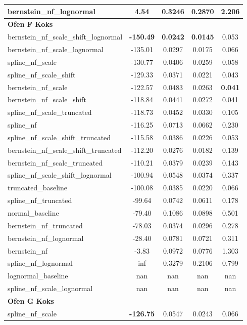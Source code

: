 \begin{table}[t]
\begin{tabular}{lcccc}
  bernstein\_nf\_lognormal & 4.54 & 0.3246 & 0.2870 & 2.206 \\
\midrule
\multicolumn{5}{l}{\textbf{Ofen F Koks}} \\
  bernstein\_nf\_scale\_shift\_lognormal & \textbf{-150.49} & \textbf{0.0242} & \textbf{0.0145} & 0.053 \\
  bernstein\_nf\_scale\_lognormal & -135.01 & 0.0297 & 0.0175 & 0.066 \\
  spline\_nf\_scale & -130.77 & 0.0406 & 0.0259 & 0.058 \\
  spline\_nf\_scale\_shift & -129.33 & 0.0371 & 0.0221 & 0.043 \\
  bernstein\_nf\_scale & -122.57 & 0.0483 & 0.0263 & \textbf{0.041} \\
  bernstein\_nf\_scale\_shift & -118.84 & 0.0441 & 0.0272 & 0.041 \\
  spline\_nf\_scale\_truncated & -118.73 & 0.0452 & 0.0330 & 0.105 \\
  spline\_nf & -116.25 & 0.0713 & 0.0662 & 0.230 \\
  spline\_nf\_scale\_shift\_truncated & -115.58 & 0.0386 & 0.0226 & 0.053 \\
  bernstein\_nf\_scale\_shift\_truncated & -112.20 & 0.0276 & 0.0182 & 0.139 \\
  bernstein\_nf\_scale\_truncated & -110.21 & 0.0379 & 0.0239 & 0.143 \\
  spline\_nf\_scale\_shift\_lognormal & -100.94 & 0.0548 & 0.0374 & 0.337 \\
  truncated\_baseline & -100.08 & 0.0385 & 0.0220 & 0.066 \\
  spline\_nf\_truncated & -99.64 & 0.0742 & 0.0611 & 0.178 \\
  normal\_baseline & -79.40 & 0.1086 & 0.0898 & 0.501 \\
  bernstein\_nf\_truncated & -78.03 & 0.0374 & 0.0296 & 0.278 \\
  bernstein\_nf\_lognormal & -28.40 & 0.0781 & 0.0721 & 0.311 \\
  bernstein\_nf & -3.83 & 0.0972 & 0.0776 & 1.303 \\
  spline\_nf\_lognormal & inf & 0.3279 & 0.2106 & 0.799 \\
  lognormal\_baseline & nan & nan & nan & nan \\
  spline\_nf\_scale\_lognormal & nan & nan & nan & nan \\
\midrule
\multicolumn{5}{l}{\textbf{Ofen G Koks}} \\
  spline\_nf\_scale & \textbf{-126.75} & 0.0547 & 0.0243 & 0.066 \\

\end{tabular}
\end{table}
